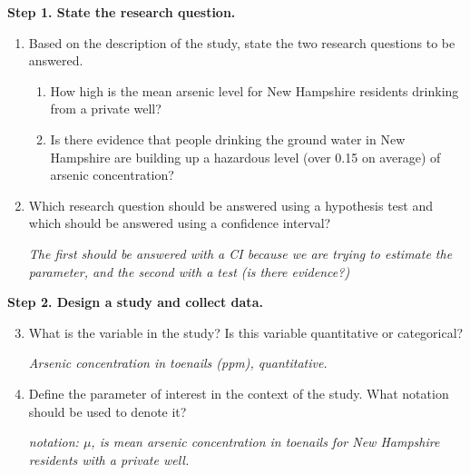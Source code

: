 {\bf Step 1. State the research question. }
\begin{enumerate}
\item  \label{researchQs}Based on the description of the study, state the two research
  questions to be answered.

\begin{key}
  {\it 
    \begin{enumerate}
    \item How high is the mean arsenic level for New Hampshire residents
 drinking from a private well?
    \item Is there evidence that people drinking the ground water in New
 Hampshire are building up a hazardous  level (over 0.15 on average)
 of arsenic concentration? 

    \end{enumerate}
}
\end{key}
  

\item  Which research question should be answered using a hypothesis
  test and which should be answered using a confidence interval? 

\begin{students}
  \vspace{1.5cm}
\end{students}

\begin{key}
  {\it The first should be answered with a CI because we are trying to
    estimate the parameter,  and the second with a test (is there evidence?)}
\end{key}
\end{enumerate}

{\bf Step 2. Design a study and collect data. }
  \begin{enumerate}
  \setcounter{enumi}{2}
   \item  What is the variable in the study?  Is this variable quantitative
     or categorical?
\begin{students}
  \vspace{2.5cm}
\end{students}

\begin{key}
  {\it Arsenic concentration in toenails (ppm), quantitative.}
\end{key}

\item 
Define the parameter of interest in the context of the study.  What
notation should be used to denote it?
\begin{students}
  \vspace{1cm}
\end{students}

\begin{key}
  {\it notation: $\mu$, is mean arsenic concentration in toenails for New Hampshire residents with a private well.}
\end{key}
\end{enumerate}

